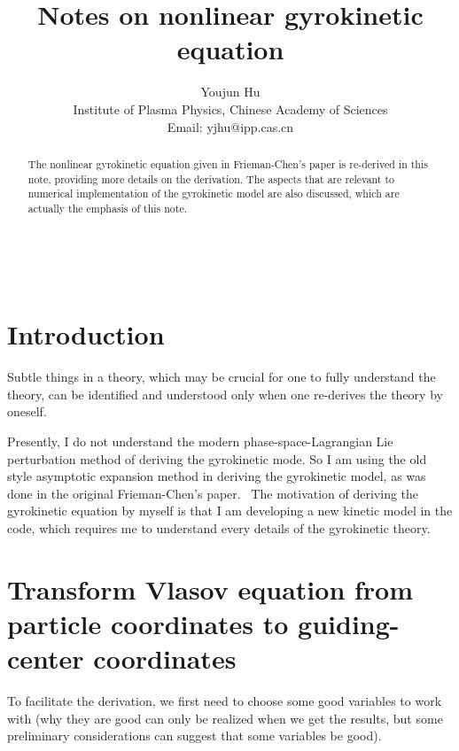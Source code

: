 \documentclass{article}
\newcommand{\tmaffiliation}[1]{\\ #1}
\newcommand{\tmtexttt}[1]{{\ttfamily{#1}}}
\begin{document}
\

\title{Notes on nonlinear gyrokinetic equation}

\author{
  Youjun Hu
  \tmaffiliation{Institute of Plasma Physics, Chinese Academy of Sciences\\
  Email: yjhu@ipp.cas.cn}
}

\maketitle

\begin{abstract}
  The nonlinear gyrokinetic equation given in Frieman-Chen's
  paper{\cite{frieman1982}} is re-derived in this note, providing more details
  on the derivation. The aspects that are relevant to numerical implementation
  of the gyrokinetic model are also discussed, which are actually the emphasis
  of this note.
\end{abstract}

\section{Introduction}

Subtle things in a theory, which may be crucial for one to fully understand
the theory, can be identified and understood only when one re-derives the
theory by oneself.

Presently, I do not understand the modern phase-space-Lagrangian Lie
perturbation method of deriving the gyrokinetic mode. So I am using the old
style asymptotic expansion method in deriving the gyrokinetic model, as was
done in the original Frieman-Chen's paper{\cite{frieman1982}}. \ The
motivation of deriving the gyrokinetic equation by myself is that I am
developing a new kinetic model in the \tmtexttt{GEM} code, which requires me
to understand every details of the gyrokinetic theory.

\section{Transform Vlasov equation from particle coordinates to guiding-center
coordinates}

To facilitate the derivation, we first need to choose some good variables to
work with (why they are good can only be realized when we get the results, but
some preliminary considerations can suggest that some variables be good).
\end{document}
